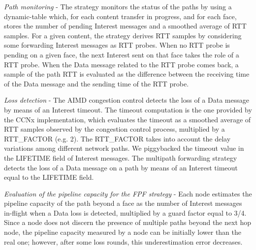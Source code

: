 \documentclass{sig-alternate-10pt}
\begin{document}
\emph{Path monitoring} - The strategy monitors the status of the paths by using a dynamic-table which, for each content transfer in progress, and for each face, stores the number of pending Interest messages and a smoothed average of RTT samples. For a given content, the strategy derives RTT samples by considering some forwarding Interest messages as RTT probes. When no RTT probe is pending on a given face, the next Interest sent on that face takes the role of a RTT probe. When the Data message related to the RTT probe comes back, a sample of the path RTT is evaluated as the difference between the receiving time of the Data message and the sending time of the RTT probe.

\emph{Loss detection} -  The AIMD congestion control detects the loss of a Data message by means of an Interest timeout. The timeout computation is the one provided by the CCNx implementation, which evaluates the timeout as a smoothed average of RTT samples observed by the congestion control process, multiplied by a RTT\_FACTOR (e.g. 2). The RTT\_FACTOR takes into account the delay variations among different network paths. We piggybacked the timeout value in the LIFETIME field of Interest messages. The multipath forwarding strategy detects the loss of a Data message on a path by means of an Interest timeout equal to the LIFETIME field. 

\emph{Evaluation of the pipeline capacity for the FPF strategy} - Each node estimates the pipeline capacity of the path beyond a face as the number of Interest messages in-flight when a Data loss is detected, multiplied by a guard factor equal to 3/4. Since a node does not discern the presence of multiple paths beyond the next hop node, the pipeline capacity measured by a node can be initially lower than the real one; however, after some loss rounds, this underestimation error decreases.
\end{document}
